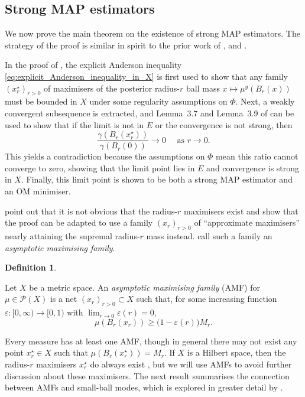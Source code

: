 \documentclass[11pt]{article}
\newcommand*{\cball}[2]{B_{#2}(#1)}
\newcommand*{\defterm}{\emph}%
\newcommand*{\prob}[1]{\mathscr{P}(#1)}
\renewcommand*{\geq}{\geqslant}
\newcommand*{\crcdf}[2]{\mu(\cball{#1}{#2})}
\theoremstyle{plain}
\theoremstyle{definition}
\newtheorem{definition}[theorem]{Definition}
\numberwithin{equation}{section}
\numberwithin{figure}{section}
\numberwithin{table}{section}
\begin{document}
\subsection{Strong MAP estimators}
We now prove the main theorem on the existence of strong MAP estimators.
The strategy of the proof is similar in spirit to the prior work of \citet{DashtiLawStuartVoss2013}, \citet{Kretschmann2019,Kretschmann2022} and \citet{KlebanovWacker2022}.

In the proof of \citet{DashtiLawStuartVoss2013}, the explicit Anderson inequality \eqref{eq:explicit_Anderson_inequality_in_X} is first used to show that any family $(x_{r}^{\star})_{r > 0}$ of maximisers of the posterior radius-$r$ ball mass $x \mapsto \mu^{y}(\cball{x}{r})$ must be bounded in $X$ under some regularity assumptions on $\Phi$. 
Next, a weakly convergent subsequence is extracted, and Lemma~3.7 and Lemma~3.9 of \citet{DashtiLawStuartVoss2013} can be used to show that if the limit is not in $E$ or the convergence is not strong, then
\begin{equation*}
	\frac{\gamma(\cball{x_{r}^{\star}}{r})}{\gamma(\cball{0}{r})} \to 0 \text{~~~~as $r \to 0$.}
\end{equation*}
This yields a contradiction because the assumptions on $\Phi$ mean this ratio cannot converge to zero, showing that the limit point lies in $E$ and convergence is strong in $X$.
Finally, this limit point is shown to be both a strong MAP estimator and an OM minimiser.

\citet{KlebanovWacker2022} point out that it is not obvious that the radius-$r$ maximisers exist and show that the proof can be adapted to use a family $(x_{r})_{r > 0}$ of ``approximate maximisers'' nearly attaining the supremal radius-$r$ mass instead.
\citet{KlebanovWacker2022} call such a family an \defterm{asymptotic maximising family}.

\begin{definition}
	\label{def:AMF}

	Let $X$ be a metric space.
	An \defterm{asymptotic maximising family} (AMF) for $\mu \in \prob{X}$ is a net $(x_r)_{r > 0} \subset X$ such that, for some increasing function $\varepsilon \colon [0, \infty) \to [0, 1)$ with $\lim_{r \to 0} \varepsilon(r) = 0$,
	\begin{equation*}
		\crcdf{x_r}{r} \geq \bigl(1 - \varepsilon(r)\bigr) M_r.
	\end{equation*}
\end{definition}

Every measure has at least one AMF, though in general there may not exist any point $x_{r}^{\star} \in X$ such that $\crcdf{x_r^{\star}}{r} = M_r$.
If $X$ is a Hilbert space, then the radius-$r$ maximisers $x_{r}^{\star}$ do always exist \citep[Corollary~A.9]{LambleySullivan2023}, but we will use AMFs to avoid further discussion about these maximisers.
The next result summarises the connection between AMFs and small-ball modes, which is explored in greater detail by \citet[Theorem~4.11]{LambleySullivan2023}.
\end{document}

